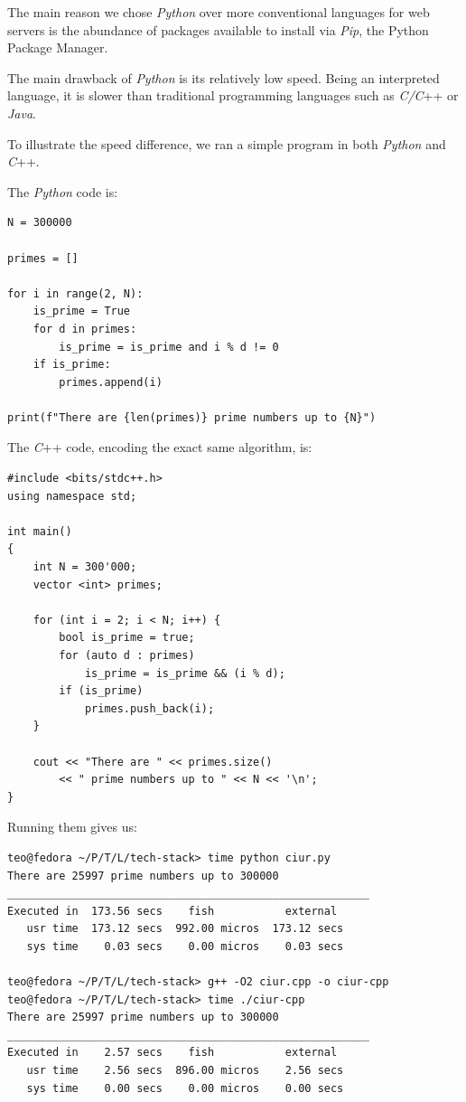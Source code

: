 \documentclass[11pt, a4paper]{report}
\begin{document}
The main reason we chose \textit{Python} over more conventional languages for web servers is the abundance of packages available to install via \textit{Pip}, the Python Package Manager.

The main drawback of \textit{Python} is its relatively low speed. Being an interpreted language, it is slower than traditional programming languages such as \textit{C/C}++ or \textit{Java}.

To illustrate the speed difference, we ran a simple program in both \textit{Python} and \textit{C}++.

The \textit{Python} code is:

\begin{verbatim}
N = 300000

primes = []

for i in range(2, N):
    is_prime = True
    for d in primes:
        is_prime = is_prime and i % d != 0
    if is_prime:
        primes.append(i)

print(f"There are {len(primes)} prime numbers up to {N}")
\end{verbatim}

The \textit{C}++ code, encoding the exact same algorithm, is:
\begin{verbatim}
#include <bits/stdc++.h>
using namespace std;

int main()
{
    int N = 300'000;
    vector <int> primes;

    for (int i = 2; i < N; i++) {
        bool is_prime = true;
        for (auto d : primes)
            is_prime = is_prime && (i % d);
        if (is_prime)
            primes.push_back(i);
    }

    cout << "There are " << primes.size()
        << " prime numbers up to " << N << '\n';
}
\end{verbatim}

Running them gives us:
\begin{verbatim}
teo@fedora ~/P/T/L/tech-stack> time python ciur.py
There are 25997 prime numbers up to 300000
________________________________________________________
Executed in  173.56 secs    fish           external
   usr time  173.12 secs  992.00 micros  173.12 secs
   sys time    0.03 secs    0.00 micros    0.03 secs

teo@fedora ~/P/T/L/tech-stack> g++ -O2 ciur.cpp -o ciur-cpp
teo@fedora ~/P/T/L/tech-stack> time ./ciur-cpp
There are 25997 prime numbers up to 300000
________________________________________________________
Executed in    2.57 secs    fish           external
   usr time    2.56 secs  896.00 micros    2.56 secs
   sys time    0.00 secs    0.00 micros    0.00 secs
\end{verbatim}
\end{document}
